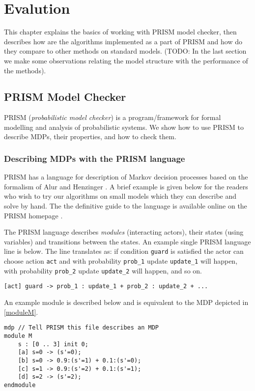 \chapter{Evalution}

This chapter explains the basics of working with PRISM model checker,
then describes how are the algorithms implemented as a part of PRISM and
how do they compare to other methods on standard models.
(TODO: In the last section we make some observations relating the model
structure with the performance of the methods).

\section{PRISM Model Checker}

PRISM \parencite{prism}
({\em probabilistic model checker}) is a program/framework
for formal modelling and analysis of probabilistic systems.
We show how to use PRISM to describe MDPs, their properties,
and how to check them.

\subsection*{Describing MDPs with the PRISM language}
PRISM has a language for description of Markov decision processes
based on the formalism of Alur and Henzinger \parencite{ReactiveModules}.
A brief example is given below for the readers who wish to try our
algorithms on small models which they can describe and solve by hand.
The the definitive guide to the language is available online on the
PRISM homepage \parencite{prism_lang}.

The PRISM language describes {\em modules} (interacting actors),
their states (using variables) and transitions between the states.
An example single PRISM language line is below. The line translates as:
if condition \verb|guard| is satisfied the actor can choose action \verb|act|
and
with probability \verb|prob_1| update \verb|update_1| will happen,
with probability \verb|prob_2| update \verb|update_2| will happen,
and so on.

\begin{verbatim}
[act] guard -> prob_1 : update_1 + prob_2 : update_2 + ...
\end{verbatim}

An example module is described below and is equivalent to the MDP
depicted in \autoref{moduleM}.

\smallskip
\begin{verbatim}
mdp // Tell PRISM this file describes an MDP
module M
    s : [0 .. 3] init 0;
    [a] s=0 -> (s'=0);
    [b] s=0 -> 0.9:(s'=1) + 0.1:(s'=0);
    [c] s=1 -> 0.9:(s'=2) + 0.1:(s'=1);
    [d] s=2 -> (s'=2);
endmodule
\end{verbatim}
\smallskip

